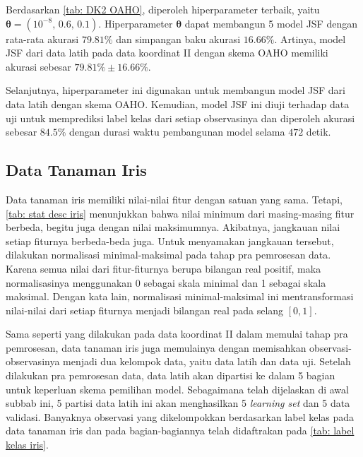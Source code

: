 \noindent Berdasarkan \ref{tab: DK2 OAHO}, diperoleh hiperparameter terbaik, yaitu $\boldsymbol{\theta} = (10^{-8} \text{, }\allowbreak \num{0,6} \text{, } \allowbreak \num{0,1})$. Hiperparameter $\boldsymbol{\theta}$ dapat membangun 5 model JSF dengan rata-rata akurasi $\num{79,81}\%$ dan simpangan baku akurasi $\num{16,66}\%$. Artinya, model JSF dari data latih pada data koordinat II dengan skema OAHO memiliki akurasi sebesar $\num{79,81}\% \pm \num{16,66}\%$.

\noindent Selanjutnya, hiperparameter ini digunakan untuk membangun model JSF dari data latih dengan skema OAHO. Kemudian, model JSF ini diuji terhadap data uji untuk memprediksi label kelas dari setiap observasinya dan  diperoleh akurasi sebesar $\num{84.5}\%$ dengan durasi waktu pembangunan model selama $472$ detik.

\subsection{Data Tanaman Iris}
\noindent Data tanaman iris memiliki nilai-nilai fitur dengan satuan yang sama. Tetapi, \ref{tab: stat desc iris} menunjukkan bahwa nilai minimum dari masing-masing fitur berbeda, begitu juga dengan nilai maksimumnya. Akibatnya, jangkauan nilai setiap fiturnya berbeda-beda juga. Untuk menyamakan jangkauan tersebut, dilakukan normalisasi minimal-maksimal pada tahap pra pemrosesan data. Karena semua nilai dari fitur-fiturnya berupa bilangan real positif, maka normalisasinya menggunakan 0 sebagai skala minimal dan 1 sebagai skala maksimal. Dengan kata lain, normalisasi minimal-maksimal ini mentransformasi nilai-nilai dari setiap fiturnya menjadi bilangan real pada selang $[0,1]$.

\noindent Sama seperti yang dilakukan pada data koordinat II dalam memulai tahap pra pemrosesan, data tanaman iris juga memulainya dengan memisahkan observasi-observasinya menjadi dua kelompok data, yaitu data latih dan data uji. Setelah dilakukan pra pemrosesan data, data latih akan dipartisi ke dalam 5 bagian untuk keperluan skema pemilihan model. Sebagaimana telah dijelaskan di awal subbab ini, 5 partisi data latih ini akan menghasilkan 5 \emph{learning set} dan 5 data validasi. Banyaknya observasi yang dikelompokkan berdasarkan label kelas pada data tanaman iris dan pada bagian-bagiannya telah didaftrakan pada \ref{tab: label kelas iris}.

